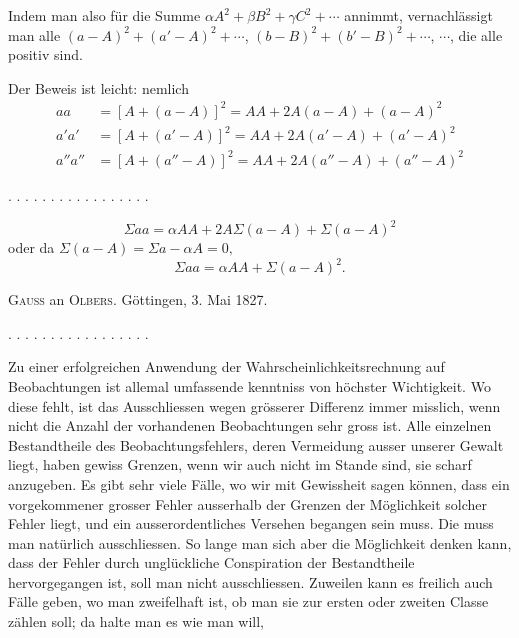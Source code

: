 Indem man also für die Summe $\alpha A^2+\beta B^2+\gamma C^2+\cdots$ annimmt, vernachlässigt
man alle $(a-A)^2+(a'-A)^2+\cdots$, $(b-B)^2+(b'-B)^2+\cdots$, $\cdots$, die alle positiv sind.

Der Beweis ist leicht: nemlich
\[
\begin{aligned}
aa &= [A+(a-A)]^2 = AA+2A(a-A)+(a-A)^2\\
a'a' &= [A+(a'-A)]^2 = AA+2A(a'-A)+(a'-A)^2\\
a''a'' &= [A+(a''-A)]^2 = AA+2A(a''-A)+(a''-A)^2
\end{aligned}
\]
\begin{center}
. . . . . . . . . . . . . . . . .
\end{center}
\[
\Sigma aa = \alpha AA+2A\Sigma(a-A)+\Sigma(a-A)^2
\]
oder da $\Sigma(a-A)=\Sigma a-\alpha A=0,$
\[
\Sigma aa = \alpha AA+\Sigma(a-A)^2.
\]
\begin{center}
\textsc{Gauss} an \textsc{Olbers}. Göttingen, 3. Mai 1827.
\end{center}

\begin{center}
. . . . . . . . . . . . . . . . .
\end{center}

Zu einer erfolgreichen Anwendung der Wahrscheinlichkeitsrechnung auf Beobachtungen ist
allemal umfassende kenntniss von höchster Wichtigkeit. Wo diese fehlt, ist das
Ausschliessen wegen grösserer Differenz immer misslich, wenn nicht die Anzahl der
vorhandenen Beobachtungen sehr gross ist. Alle einzelnen Bestandtheile des
Beobachtungsfehlers, deren Vermeidung ausser unserer Gewalt liegt, haben gewiss Grenzen,
wenn wir auch nicht im Stande sind, sie scharf anzugeben. Es gibt sehr viele Fälle, wo wir
mit Gewissheit sagen können, dass ein vorgekommener grosser Fehler ausserhalb der Grenzen
der Möglichkeit solcher Fehler liegt, und ein ausserordentliches Versehen begangen sein
muss. Die muss man natürlich ausschliessen. So lange man sich aber die Möglichkeit denken
kann, dass der Fehler durch unglückliche Conspiration der Bestandtheile hervorgegangen ist,
soll man nicht ausschliessen. Zuweilen kann es freilich auch Fälle geben, wo man
zweifelhaft ist, ob man sie zur ersten oder zweiten Classe zählen soll; da halte man es wie
man will,
